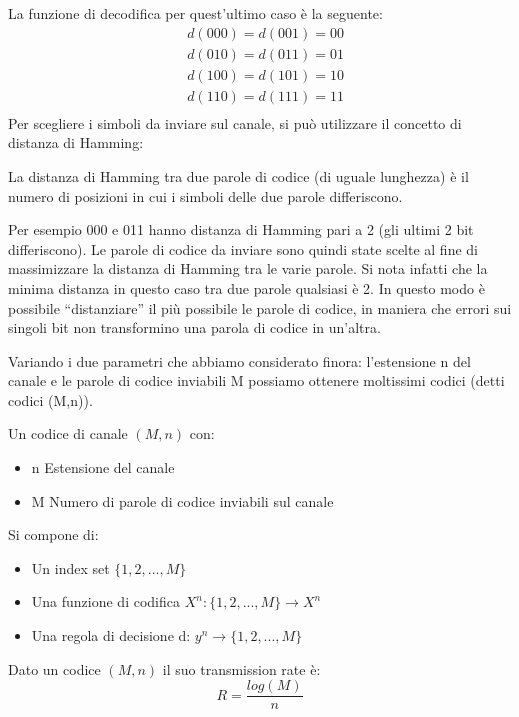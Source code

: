\newpage
\noindent
La funzione di decodifica per quest'ultimo caso è la seguente:
\[\begin{split}
 &d(000)=d(001)=00  \\
 &d(010)=d(011)=01  \\
 &d(100)=d(101)=10  \\
 &d(110)=d(111)=11  \\
 \end{split}
\]
Per scegliere i simboli da inviare sul canale, si può utilizzare il concetto di distanza di Hamming:
\begin{definizione}
La distanza di Hamming tra due parole di codice (di uguale lunghezza) è il numero di posizioni in cui i 
simboli delle due parole differiscono.
\end{definizione}

Per esempio 000 e 011 hanno distanza di Hamming pari a 2 (gli ultimi 2 bit differiscono). Le parole di codice da inviare sono 
quindi state scelte al fine di massimizzare la distanza di Hamming tra le varie parole. Si nota infatti che la minima distanza in 
questo caso tra due parole qualsiasi è 2. In questo modo è possibile ``distanziare'' il più possibile le parole di codice, in maniera che errori sui singoli bit non transformino una parola di codice in un'altra.

Variando i due parametri che abbiamo considerato finora: l'estensione n del canale e le parole di codice inviabili M possiamo ottenere moltissimi codici (detti codici (M,n)).

\begin{definizione}
Un codice di canale $(M,n)$ con:
\begin{itemize}
 \item n Estensione del canale
 \item M Numero di parole di codice inviabili sul canale
\end{itemize}
Si compone di:
\begin{itemize}
 \item Un index set $\{1,2,...,M\}$
 \item Una funzione di codifica $X^n: \{1,2,...,M\} \to X^n$
 \item Una regola di decisione d: $y^n \to \{1,2,...,M\}$
\end{itemize}

\end{definizione}

\begin{osservazione}
 Dato un codice $(M,n)$ il suo transmission rate è:
\[
 R=\frac{log(M)}{n}
\]

\end{osservazione}

